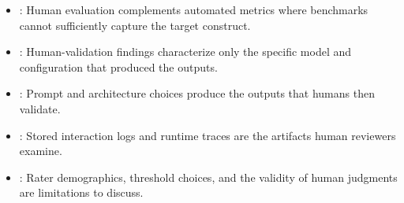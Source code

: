 \begin{itemize}[label=$\rightarrow$]
    \item \seebenchmarksmetrics: Human evaluation complements automated metrics where benchmarks cannot sufficiently capture the target construct.
    \item \seemodelversion: Human-validation findings characterize only the specific model and configuration that produced the outputs.
    \item \seedesign: Prompt and architecture choices produce the outputs that humans then validate.
    \item \seetraces: Stored interaction logs and runtime traces are the artifacts human reviewers examine.
    \item \seelimitationsmitigations: Rater demographics, threshold choices, and the validity of human judgments are limitations to discuss.
\end{itemize}